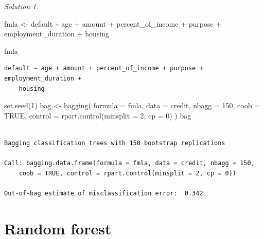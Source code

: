 \documentclass[
  letterpaper,
  DIV=11,
  numbers=noendperiod]{scrreprt}
\newenvironment{Shaded}{\begin{snugshade}}{\end{snugshade}}
\newcommand{\AttributeTok}[1]{\textcolor[rgb]{0.40,0.45,0.13}{#1}}
\newcommand{\ConstantTok}[1]{\textcolor[rgb]{0.56,0.35,0.01}{#1}}
\newcommand{\DecValTok}[1]{\textcolor[rgb]{0.68,0.00,0.00}{#1}}
\newcommand{\FunctionTok}[1]{\textcolor[rgb]{0.28,0.35,0.67}{#1}}
\newcommand{\NormalTok}[1]{\textcolor[rgb]{0.00,0.23,0.31}{#1}}
\newcommand{\OtherTok}[1]{\textcolor[rgb]{0.00,0.23,0.31}{#1}}
\newcommand{\SpecialCharTok}[1]{\textcolor[rgb]{0.37,0.37,0.37}{#1}}
\theoremstyle{definition}
\theoremstyle{remark}
\newtheorem*{solution}{Solution}
\begin{document}
\begin{solution}

\begin{Shaded}
\begin{Highlighting}[]
\NormalTok{fmla }\OtherTok{\textless{}{-}}\NormalTok{ default }\SpecialCharTok{\textasciitilde{}}\NormalTok{ age }\SpecialCharTok{+}\NormalTok{ amount }\SpecialCharTok{+}\NormalTok{ percent\_of\_income }\SpecialCharTok{+}\NormalTok{ purpose }\SpecialCharTok{+}\NormalTok{ employment\_duration }\SpecialCharTok{+}\NormalTok{ housing }

\NormalTok{fmla}
\end{Highlighting}
\end{Shaded}

\begin{verbatim}
default ~ age + amount + percent_of_income + purpose + employment_duration + 
    housing
\end{verbatim}

\begin{Shaded}
\begin{Highlighting}[]
\FunctionTok{set.seed}\NormalTok{(}\DecValTok{1}\NormalTok{)}
\NormalTok{bag }\OtherTok{\textless{}{-}} \FunctionTok{bagging}\NormalTok{(}
  \AttributeTok{formula =}\NormalTok{ fmla,}
  \AttributeTok{data =}\NormalTok{ credit,}
  \AttributeTok{nbagg =} \DecValTok{150}\NormalTok{,   }
  \AttributeTok{coob =} \ConstantTok{TRUE}\NormalTok{,}
  \AttributeTok{control =} \FunctionTok{rpart.control}\NormalTok{(}\AttributeTok{minsplit =} \DecValTok{2}\NormalTok{, }\AttributeTok{cp =} \DecValTok{0}\NormalTok{)}
\NormalTok{)}
\NormalTok{bag}
\end{Highlighting}
\end{Shaded}

\begin{verbatim}

Bagging classification trees with 150 bootstrap replications 

Call: bagging.data.frame(formula = fmla, data = credit, nbagg = 150, 
    coob = TRUE, control = rpart.control(minsplit = 2, cp = 0))

Out-of-bag estimate of misclassification error:  0.342 
\end{verbatim}

\end{solution}


\hypertarget{random-forest}{%
\chapter{Random forest}\label{random-forest}}
\end{document}
